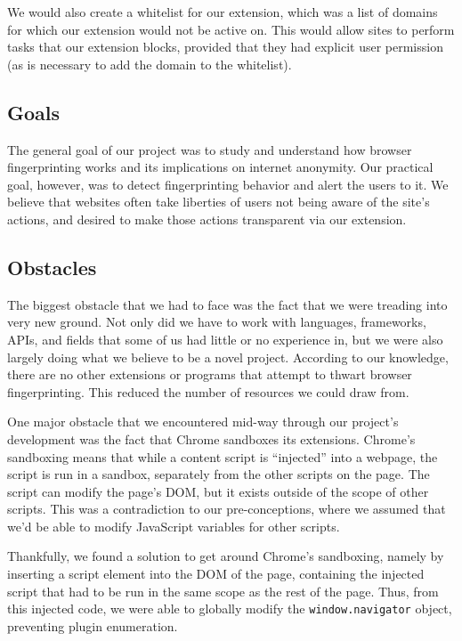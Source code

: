 \documentclass[12pt,a4paper]{article}
\begin{document}
We would also create a whitelist for our extension, which was a list of domains for which our extension would not be active on. This would allow sites to perform tasks that our extension blocks, provided that they had explicit user permission (as is necessary to add the domain to the whitelist).

\subsection{Goals}
The general goal of our project was to study and understand how browser fingerprinting works and its implications on internet anonymity. Our practical goal, however, was to detect fingerprinting behavior and alert the users to it. We believe that websites often take liberties of users not being aware of the site's actions, and desired to make those actions transparent via our extension.

\subsection{Obstacles}
The biggest obstacle that we had to face was the fact that we were treading into very new ground. Not only did we have to work with languages, frameworks, APIs, and fields that some of us had little or no experience in, but we were also largely doing what we believe to be a novel project. According to our knowledge, there are no other extensions or programs that attempt to thwart browser fingerprinting. This reduced the number of resources we could draw from.

One major obstacle that we encountered mid-way through our project's development was the fact that Chrome sandboxes its extensions. Chrome's sandboxing means that while a content script is ``injected'' into a webpage, the script is run in a sandbox, separately from the other scripts on the page. The script can modify the page's DOM, but it exists outside of the scope of other scripts. This was a contradiction to our pre-conceptions, where we assumed that we'd be able to modify JavaScript variables for other scripts.

Thankfully, we found a solution to get around Chrome's sandboxing, namely by inserting a script element into the DOM of the page, containing the injected script that had to be run in the same scope as the rest of the page. Thus, from this injected code, we were able to globally modify the \texttt{window.navigator} object, preventing plugin enumeration.
\end{document}
